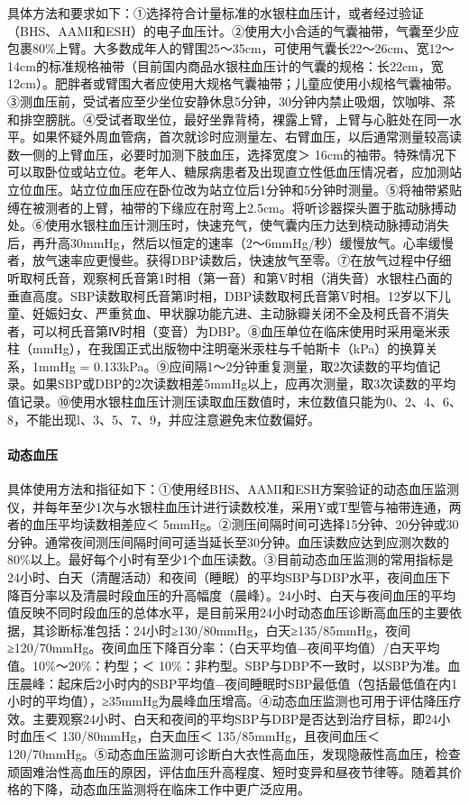 具体方法和要求如下：①选择符合计量标准的水银柱血压计，或者经过验证（BHS、AAMI和ESH）的电子血压计。②使用大小合适的气囊袖带，气囊至少应包裹80\%上臂。大多数成年人的臂围25～35cm，可使用气囊长22～26cm、宽12～14cm的标准规格袖带（目前国内商品水银柱血压计的气囊的规格：长22cm，宽12cm）。肥胖者或臂围大者应使用大规格气囊袖带；儿童应使用小规格气囊袖带。③测血压前，受试者应至少坐位安静休息5分钟，30分钟内禁止吸烟，饮咖啡、茶和排空膀胱。④受试者取坐位，最好坐靠背椅，裸露上臂，上臂与心脏处在同一水平。如果怀疑外周血管病，首次就诊时应测量左、右臂血压，以后通常测量较高读数一侧的上臂血压，必要时加测下肢血压，选择宽度＞
16cm的袖带。特殊情况下可以取卧位或站立位。老年人、糖尿病患者及出现直立性低血压情况者，应加测站立位血压。站立位血压应在卧位改为站立位后1分钟和5分钟时测量。⑤将袖带紧贴缚在被测者的上臂，袖带的下缘应在肘弯上2.5cm。将听诊器探头置于肱动脉搏动处。⑥使用水银柱血压计测压时，快速充气，使气囊内压力达到桡动脉搏动消失后，再升高30mmHg，然后以恒定的速率（2～6mmHg/秒）缓慢放气。心率缓慢者，放气速率应更慢些。获得DBP读数后，快速放气至零。⑦在放气过程中仔细听取柯氏音，观察柯氏音第1时相（第一音）和第V时相（消失音）水银柱凸面的垂直高度。SBP读数取柯氏音第l时相，DBP读数取柯氏音第V时相。12岁以下儿童、妊娠妇女、严重贫血、甲状腺功能亢进、主动脉瓣关闭不全及柯氏音不消失者，可以柯氏音第Ⅳ时相（变音）为DBP。⑧血压单位在临床使用时采用毫米汞柱（mmHg），在我国正式出版物中注明毫米汞柱与千帕斯卡（kPa）的换算关系，1mmHg
=
0.133kPa。⑨应间隔1～2分钟重复测量，取2次读数的平均值记录。如果SBP或DBP的2次读数相差5mmHg以上，应再次测量，取3次读数的平均值记录。⑩使用水银柱血压计测压读取血压数值时，末位数值只能为0、2、4、6、8，不能出现l、3、5、7、9，并应注意避免末位数偏好。

\paragraph{动态血压}

具体使用方法和指征如下：①使用经BHS、AAMI和ESH方案验证的动态血压监测仪，并每年至少1次与水银柱血压计进行读数校准，采用Y或T型管与袖带连通，两者的血压平均读数相差应＜
5mmHg。②测压间隔时间可选择15分钟、20分钟或30分钟。通常夜间测压间隔时间可适当延长至30分钟。血压读数应达到应测次数的80\%以上。最好每个小时有至少1个血压读数。③目前动态血压监测的常用指标是24小时、白天（清醒活动）和夜间（睡眠）的平均SBP与DBP水平，夜间血压下降百分率以及清晨时段血压的升高幅度（晨峰）。24小时、白天与夜间血压的平均值反映不同时段血压的总体水平，是目前采用24小时动态血压诊断高血压的主要依据，其诊断标准包括：24小时≥130/80mmHg，白天≥135/85mmHg，夜间≥120/70mmHg。夜间血压下降百分率：（白天平均值−夜间平均值）/白天平均值。10\%～20\%：杓型；＜
10\%：非杓型。SBP与DBP不一致时，以SBP为准。血压晨峰：起床后2小时内的SBP平均值−夜间睡眠时SBP最低值（包括最低值在内1小时的平均值），≥35mmHg为晨峰血压增高。④动态血压监测也可用于评估降压疗效。主要观察24小时、白天和夜间的平均SBP与DBP是否达到治疗目标，即24小时血压＜
130/80mmHg，白天血压＜ 135/85mmHg，且夜间血压＜
120/70mmHg。⑤动态血压监测可诊断白大衣性高血压，发现隐蔽性高血压，检查顽固难治性高血压的原因，评估血压升高程度、短时变异和昼夜节律等。随着其价格的下降，动态血压监测将在临床工作中更广泛应用。

